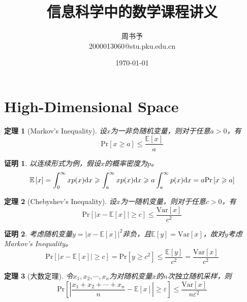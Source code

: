 \documentclass[8pt]{article}
\title{\heiti\zihao{1} 信息科学中的数学\quad 课程讲义}
\author{\kaishu\zihao{-3} 周书予\\2000013060@stu.pku.edu.cn}
\date{\today}
\theoremstyle{compact}
\newtheorem{theorem}{定理}
\newtheorem{Proof}{证明}
\def\le{\leqslant}
\def\ge{\geqslant}
\def\Pr#1{\text{Pr}\left[{#1}\right]}
\def\E#1{\mathbb{E}\left[{#1}\right]}
\def\Var#1{\text{Var}\left[{#1}\right]}
\begin{document}
\pagestyle{fancy}


\maketitle

\section{High-Dimensional Space}

\begin{theorem}[Markov's Inequality]
	设$x$为一非负随机变量，则对于任意$a > 0$，有\begin{equation}
	\Pr{x \ge a} \le \frac{\E{x}}{a}
	\end{equation}
\end{theorem}
\begin{Proof}
	以连续形式为例，假设$x$的概率密度为$p$。
	\begin{equation}
	\E{x} = \int_{0}^{\infty}xp(x)\text dx \ge \int_{a}^{\infty}xp(x)\text dx \ge a\int_{a}^{\infty}p(x)\text dx = a\Pr{x \ge a}
	\end{equation}
\end{Proof}
\begin{theorem}[Chebyshev's Inequality]
	设$x$为一随机变量，则对于任意$c > 0$，有
	\begin{equation}
	\Pr{|x - \E{x}| \ge c} \le \frac{\Var{x}}{c^2}
	\end{equation}
\end{theorem}
\begin{Proof}
	考虑随机变量$y = |x - \E{x}|^2$非负，且$\E{y} = \Var{x}$，故对$y$考虑Markov's Inequality。
	\begin{equation}
	\Pr{|x - \E{x}| \ge c} = \Pr{y \ge c^2} \le \frac{\E{y}}{c^2} = \frac{\Var{x}}{c^2}
	\end{equation}
\end{Proof}
\begin{theorem}[大数定理]
	令$x_1, x_2, \cdots, x_n$为对随机变量$x$的$n$次独立随机采样，则
	\begin{equation}
		\Pr{ \left|\frac{x_1 + x_2 + \cdots + x_n}{n} - \E{x}\right| \ge \varepsilon} \le \frac{\Var{x}}{n\varepsilon^2}
	\end{equation}
\end{theorem}
\end{document}
